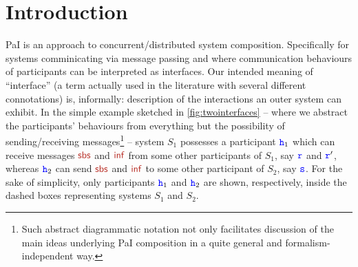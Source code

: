 
\section{Introduction}
\label{sec:Intro}

PaI is an approach to concurrent/distributed system composition. 
Specifically for systems comminicating via message passing and where
communication behaviours of participants can be interpreted as interfaces.  
Our intended meaning of ``interface'' (a term actually used in the literature with  several different connotations) is, informally: description of the interactions an outer system can
exhibit. 
In the simple example sketched in \cref{fig:twointerfaces}
--  where we abstract the participants' behaviours from everything but the possibility of 
 sending/receiving messages\footnote{Such abstract diagrammatic notation not only facilitates  
 discussion of the main ideas underlying PaI composition in a quite general  and formalism-independent way.}
   -- system $S_1$ possesses a participant 
 ${\mathtt{\color{blue}{ {h}}}}_1$ which can receive messages $\msg[sbs]$ and $\msg[inf]$ from some other participants of $S_1$, say ${\mathtt{\color{blue}{ {r}}}}$ and ${\mathtt{\color{blue}{ {r}}}}'$, whereas ${\mathtt{\color{blue}{ {h}}}}_2$ can send $\msg[sbs]$ and $\msg[inf]$ to some other participant of $S_2$, say ${\mathtt{\color{blue}{ {s}}}}$. 
For the sake of simplicity, only participants ${\mathtt{\color{blue}{ {h}}}}_1$ and ${\mathtt{\color{blue}{ {h}}}}_2$ are shown, respectively, inside the dashed boxes representing systems  $S_1$ and $S_2$.

